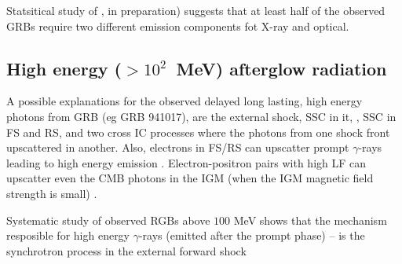 Statsitical study of \cite{X.-G. Wang et al. (2014}, in preparation) suggests that at least half of the observed GRBs require two different emission components fot X-ray and optical.



\subsection{High energy ($>10^2$~MeV) afterglow radiation}

A possible explanations for the observed delayed long lasting, high energy photons from GRB (eg  GRB 941017), are the external shock, SSC in it, \cite{Dermer et al., 2000; Zhang and Meszaros, 2001b}, SSC in FS and RS, and two cross IC processes where the photons from one shock front upscattered in another.
\cite{Wang et al., 2001a,b; Granot and Guetta, 2003; Pe'er and Waxman, 2004; Gupta and Zhang, 2007b; Fan and Piran, 2008; Zou et al., 2009b).}
Also, electrons in FS/RS can upscatter prompt $\gamma$-rays leading to high energy emission \cite{Meszaros and Rees, 1994; Beloborodov, 2005; Fan et al., 2005b}. Electron-positron pairs with high LF can upscatter even the CMB photons in the IGM (when the IGM magnetic field strength is small) \cite{Plaga, 1995}.

Systematic study of observed RGBs above $100$ MeV shows that the mechanism resposible for high energy $\gamma$-rays (emitted after the prompt phase) -- is the synchrotron process in the external forward shock \cite{Kumar and Barniol Duran, 2009, 2010; Ghisellini et al., 2010} 

